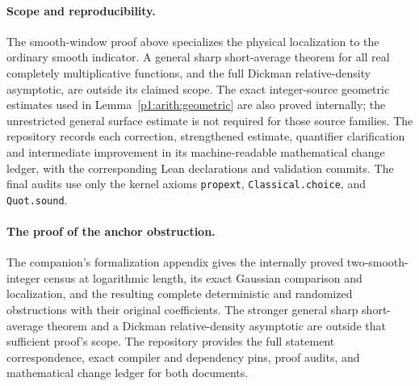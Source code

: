 \paragraph{Scope and reproducibility.}
The smooth-window proof above specializes the physical localization to the
ordinary smooth indicator.  A general sharp short-average theorem for
all real completely multiplicative functions, and the full Dickman
relative-density asymptotic, are outside its claimed scope.
The exact integer-source geometric estimates used in
Lemma~\ref{p1:arith:geometric} are also proved internally; the unrestricted
general surface estimate is not required for those source families.
The repository records each correction, strengthened estimate,
quantifier clarification and intermediate improvement in its
machine-readable mathematical change ledger, with the corresponding
Lean declarations and validation commits.
The final audits use only the kernel axioms
\texttt{propext}, \texttt{Classical.choice}, and \texttt{Quot.sound}.
\else
\paragraph{The proof of the anchor obstruction.}
The companion's formalization appendix gives the internally proved
two-smooth-integer census at logarithmic length, its exact Gaussian
comparison and localization, and the resulting complete deterministic
and randomized obstructions with their original coefficients.
The stronger general sharp short-average theorem and a Dickman
relative-density asymptotic are outside that sufficient proof's scope.
The repository provides the full statement correspondence, exact
compiler and dependency pins, proof audits, and mathematical change
ledger for both documents.
\fi
